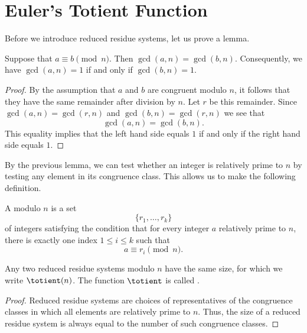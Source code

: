 \section{Euler's Totient Function}

Before we introduce reduced residue systems, let us prove a lemma.

\begin{lemma}
  Suppose that $a\equiv b\pmod{n}$. Then $\gcd(a,n)=\gcd(b,n)$. Consequently, we have $\gcd(a,n)=1$ if and only if $\gcd(b,n)=1$.
\end{lemma}

\begin{proof}
  By the assumption that $a$ and $b$ are congruent modulo $n$, it follows that they have the same remainder after division by $n$. Let $r$ be this remainder. Since $\gcd(a,n)=\gcd(r,n)$ and $\gcd(b,n)=\gcd(r,n)$ we see that
  \begin{equation*}
    \gcd(a,n)=\gcd(b,n).
  \end{equation*}
  This equality implies that the left hand side equals $1$ if and only if the right hand side equals $1$.
\end{proof}

By the previous lemma, we can test whether an integer is relatively prime to $n$ by testing any element in its congruence class. This allows us to make the following definition.

\begin{definition}
  A  modulo $n$ is a set
  \begin{equation*}
    \{r_1,\ldots,r_k\}
  \end{equation*}
  of integers satisfying the condition that for every integer $a$ relatively prime to $n$, there is exactly one index $1\leq i\leq k$ such that
  \begin{equation*}
    a\equiv r_i\pmod{n}.
  \end{equation*}
\end{definition}

\begin{corollary}
  Any two reduced residue systems modulo $n$ have the same size, for which we write $\totient(n)$. The function $\totient$ is called .
\end{corollary}

\begin{proof}
  Reduced residue systems are choices of representatives of the congruence classes in which all elements are relatively prime to $n$. Thus, the size of a reduced residue system is always equal to the number of such congruence classes.
\end{proof}

